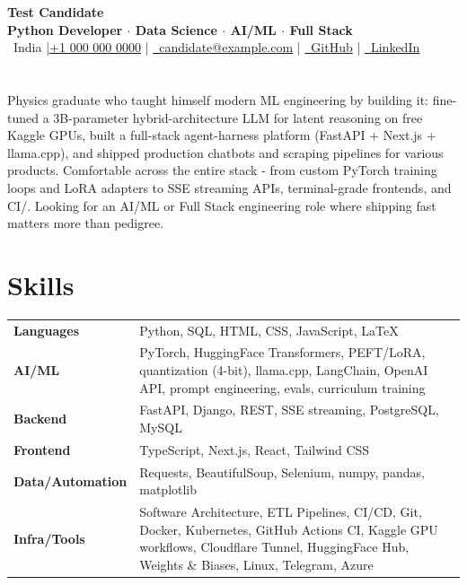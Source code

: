 \documentclass[10pt,letterpaper]{article}
\begin{document}
\begin{center}
    {\LARGE \textbf{Test Candidate}}\\[2pt]
    {\small \textbf{Python Developer $\cdot$ Data Science $\cdot$ AI/ML $\cdot$ Full Stack}}\\[2pt]
    {\small
    \faMapMarker*\, India \quad|\quad \faPhone*
    \href{tel:+10000000000}{+1 000 000 0000} \quad|\quad \faEnvelope
    \href{mailto:candidate@example.com}{\, candidate@example.com} \quad|\quad \faGithub
    \href{https://github.com/deveshpat}{\, GitHub} \quad|\quad \faLinkedin
    \href{https://www.linkedin.com/in/example/}{\, LinkedIn}
    }
\end{center}

\vspace{-20pt}

\section*{}
Physics graduate who taught himself modern ML engineering by building it: fine-tuned a 3B-parameter hybrid-architecture LLM for latent reasoning on free Kaggle GPUs, built a full-stack agent-harness platform (FastAPI + Next.js + llama.cpp), and shipped production chatbots and scraping pipelines for various products. Comfortable across the entire stack - from custom PyTorch training loops and LoRA adapters to SSE streaming APIs, terminal-grade frontends, and CI/. Looking for an AI/ML or Full Stack engineering role where shipping fast matters more than pedigree.

\section*{Skills}
{\renewcommand{\arraystretch}{1.2} \small
\begin{tabularx}{\textwidth}{@{}l X@{}}
    \textbf{Languages} & Python, SQL, HTML, CSS, JavaScript, LaTeX \\
    \textbf{AI/ML} & PyTorch, HuggingFace Transformers, PEFT/LoRA, quantization (4-bit), llama.cpp, LangChain, OpenAI API, prompt engineering, evals, curriculum training \\
    \textbf{Backend} & FastAPI, Django, REST, SSE streaming, PostgreSQL, MySQL \\
    \textbf{Frontend} & TypeScript, Next.js, React, Tailwind CSS \\
    \textbf{Data/Automation} & Requests, BeautifulSoup, Selenium, numpy, pandas, matplotlib \\
    \textbf{Infra/Tools} & Software Architecture, ETL Pipelines, CI/CD, Git, Docker, Kubernetes, GitHub Actions CI, Kaggle GPU workflows, Cloudflare Tunnel, HuggingFace Hub, Weights \& Biases, Linux, Telegram, Azure \\
\end{tabularx}}
\end{document}
